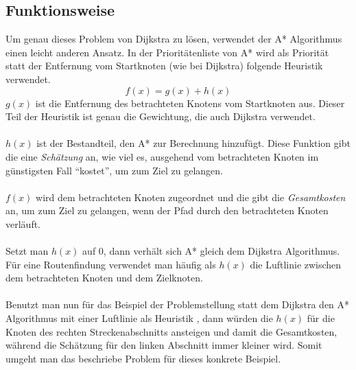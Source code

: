 \documentclass[11pt]{scrreprt}
\begin{document}
\subsection{Funktionsweise}
Um genau dieses Problem von Dijkstra zu lösen, verwendet der A* Algorithmus einen leicht anderen Ansatz.
In der Prioritätenliste von A* wird als Priorität statt der Entfernung vom Startknoten (wie bei Dijkstra) folgende Heuristik verwendet. \cite{wiki:german:astar}
\begin{equation*}
	f(x) = g(x) + h(x)
\end{equation*}
$g(x)$ ist die Entfernung des betrachteten Knotens vom Startknoten aus.
Dieser Teil der Heuristik ist genau die Gewichtung, die auch Dijkstra verwendet. \cite{wiki:german:astar}\\\\
$h(x)$ ist der Bestandteil, den A* zur Berechnung hinzufügt. Diese Funktion gibt die eine \textit{Schätzung} an, wie viel es, ausgehend vom betrachteten Knoten im günstigsten Fall \enquote{kostet}, um zum Ziel zu gelangen.\cite{wiki:german:astar}\\\\
$f(x)$ wird dem betrachteten Knoten zugeordnet und die gibt die \textit{Gesamtkosten} an, um zum Ziel zu gelangen, wenn der Pfad durch den betrachteten Knoten verläuft. \cite{wiki:german:astar}
\\\\
Setzt man $h(x)$ auf 0, dann verhält sich A* gleich dem Dijkstra Algorithmus.
Für eine Routenfindung verwendet man häufig als $h(x)$ die Luftlinie zwischen dem betrachteten Knoten und dem Zielknoten.
\\\\
Benutzt man nun für das Beispiel der Problemstellung statt dem Dijkstra den A* Algorithmus mit einer Luftlinie als Heuristik \cite{wiki:german:astar}, dann würden die $h(x)$ für die Knoten des rechten Streckenabschnitts ansteigen und damit die Gesamtkosten, während die Schätzung für den linken Abschnitt immer kleiner wird. Somit umgeht man das beschriebe Problem für dieses konkrete Beispiel.
\end{document}
